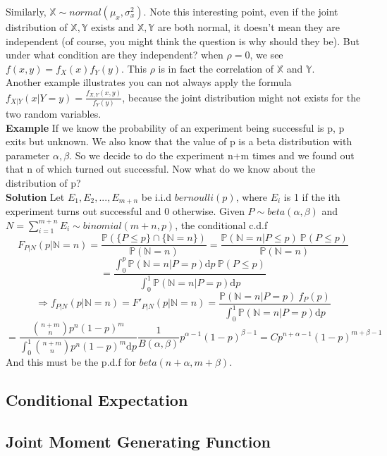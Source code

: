 \documentclass[a4paper,12pt]{article}
\begin{document}
Similarly, $\mathbb{X} \sim  normal( \mu_x, \sigma^2_x)$. Note this interesting point, even if the joint distribution of $\mathbb{X}, \mathbb{Y}$ exists and $\mathbb{X}, \mathbb{Y}$ are both normal, it doesn't mean they are independent (of course, you might think the question is why should they be). But under what condition are they independent? when $\rho = 0$, we see $f(x, y) = f_X(x)f_Y(y)$. This $\rho$ is in fact the correlation of $\mathbb{X}$ and $\mathbb{Y}$.\\

Another example illustrates you can not always apply the formula $f_{X|Y}(x|Y=y) = \frac{f_{X,Y}(x, y)}{f_Y(y)}$, because the joint distribution might not exists for the two random variables.\\

\textbf{Example} If we know the probability of an experiment being successful is p, p exits but unknown. We also know that the value of p is a beta distribution with parameter $\alpha, \beta$. So we decide to do the experiment n+m times and we found out that n of which turned out successful. Now what do we know about the distribution of p?\\

\textbf{Solution}
Let $E_1, E_2, ..., E_{m+n}$ be i.i.d $bernoulli(p)$, where $E_i$ is 1 if the ith experiment turns out successful and 0 otherwise. Given $P \sim beta(\alpha, \beta)$ and $N = \sum_{i=1}^{m+n} E_i \sim binomial(m+n, p)$, the conditional c.d.f 
$$F_{P|N}(p|\mathbb{N}=n) = \frac{\mathbb{P}( \{P \leq p\} \cap \{\mathbb{N} = n\} )}{\mathbb{P}(\mathbb{N} = n)} = \frac{\mathbb{P}( \mathbb{N} = n | P \leq p )\  \mathbb{P}( P \leq p )}{\mathbb{P}(\mathbb{N} = n)} $$
$$= \frac{\int_0^p \mathbb{P} (\mathbb{N} = n | P=p) \mathrm{d}p \  \mathbb{P}( P \leq p )}{\int_0^1 \mathbb{P} (\mathbb{N} = n | P=p) \mathrm{d}p }$$
$$\Rightarrow f_{P|N}(p|\mathbb{N}=n) = F'_{P|N}(p|\mathbb{N}=n) =   \frac{\mathbb{P} (\mathbb{N} = n | P=p)\ f_P(p)}{\int_0^1 \mathbb{P} (\mathbb{N} = n | P=p) \mathrm{d}p }$$
$$= \frac{ {n+m \choose n}p^n(1-p)^m }{\int_0^1{ n+m \choose n}p^n(1-p)^m\mathrm{d}p}\frac{1}{B(\alpha,	\beta)} p^{\alpha-1} (1-p)^{\beta-1} = C p^{n+\alpha-1} (1-p)^{m+\beta-1}$$
And this must be the p.d.f for $beta(n+\alpha, m+\beta )$.

\subsection{Conditional Expectation}

\subsection{Joint Moment Generating Function}
\end{document}
